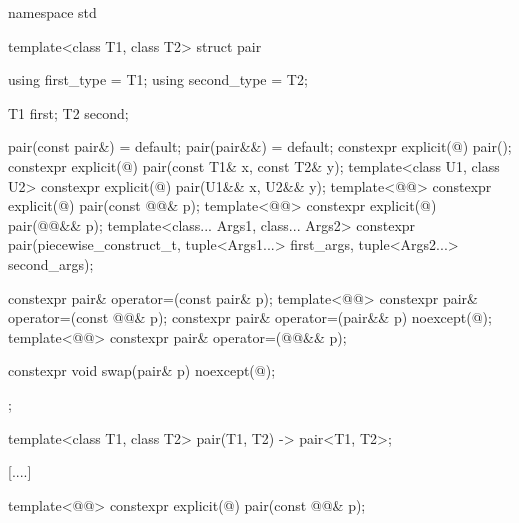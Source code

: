 \documentclass{wg21}
\begin{document}
%
\begin{codeblock}
    namespace std {
        template<class T1, class T2>
        struct pair {
            using first_type  = T1;
            using second_type = T2;

            T1 first;
            T2 second;

            pair(const pair&) = default;
            pair(pair&&) = default;
            constexpr explicit(@\seebelow@) pair();
            constexpr explicit(@\seebelow@) pair(const T1& x, const T2& y);
            template<class U1, class U2>
            constexpr explicit(@\seebelow@) pair(U1&& x, U2&& y);
            template<@@>
            constexpr explicit(@\seebelow@) pair(const @@& p);
            template<@@>
            constexpr explicit(@\seebelow@) pair(@@&& p);
            template<class... Args1, class... Args2>
            constexpr pair(piecewise_construct_t,
            tuple<Args1...> first_args, tuple<Args2...> second_args);

            constexpr pair& operator=(const pair& p);
            template<@@>
            constexpr pair& operator=(const @@& p);
            constexpr pair& operator=(pair&& p) noexcept(@\seebelow@);
            template<@@>
            constexpr pair& operator=(@@&& p);

            constexpr void swap(pair& p) noexcept(@\seebelow@);
        };

        template<class T1, class T2>
        pair(T1, T2) -> pair<T1, T2>;
    }
\end{codeblock}

[....]


%
\begin{itemdecl}
    template<@@>
    constexpr explicit(@\seebelow@) pair(const @@& p);
\end{itemdecl}
\end{document}
